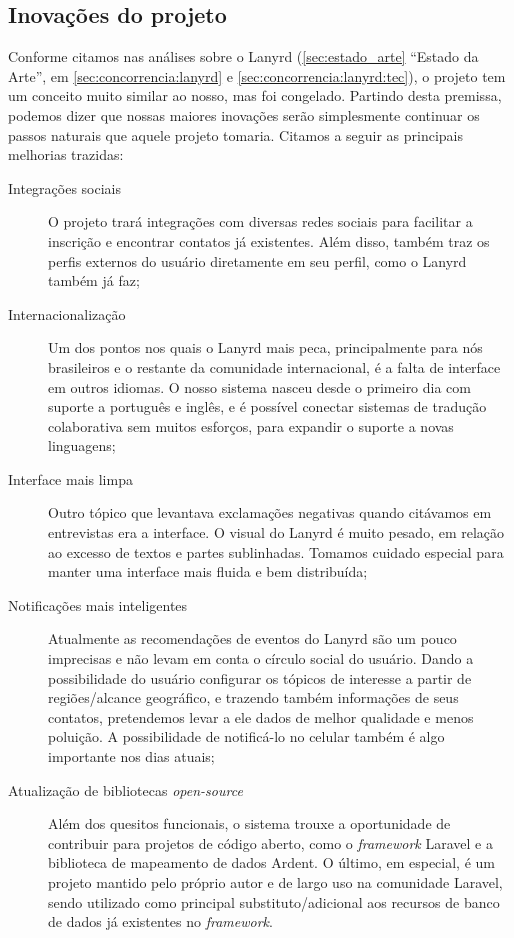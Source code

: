 \documentclass[12pt,a4paper,twoside,hyphens,english,brazil]{abntex2}
\begin{document}
{\subsection{Inovações do projeto}
Conforme citamos nas análises sobre o Lanyrd (\ref{sec:estado_arte} ``Estado da Arte'', em \ref{sec:concorrencia:lanyrd} e \ref{sec:concorrencia:lanyrd:tec}), o projeto tem um conceito muito similar ao nosso, mas foi congelado. Partindo desta premissa, podemos dizer que nossas maiores inovações serão simplesmente continuar os passos naturais que aquele projeto tomaria. Citamos a seguir as principais melhorias trazidas:

\begin{description}
	\item[Integrações sociais] O projeto trará integrações com diversas redes sociais para facilitar a inscrição e encontrar contatos já existentes. Além disso, também traz os perfis externos do usuário diretamente em seu perfil, como o Lanyrd também já faz;
	
	\item[Internacionalização] Um dos pontos nos quais o Lanyrd mais peca, principalmente para nós brasileiros e o restante da comunidade internacional, é a falta de interface em outros idiomas. O nosso sistema nasceu desde o primeiro dia com suporte a português e inglês, e é possível conectar sistemas de tradução colaborativa sem muitos esforços, para expandir o suporte a novas linguagens;
	
	\item[Interface mais limpa] Outro tópico que levantava exclamações negativas quando citávamos em entrevistas era a interface. O visual do Lanyrd é muito pesado, em relação ao excesso de textos e partes sublinhadas. Tomamos cuidado especial para manter uma interface mais fluida e bem distribuída;
	
	\item[Notificações mais inteligentes] Atualmente as recomendações de eventos do Lanyrd são um pouco imprecisas e não levam em conta o círculo social do usuário. Dando a possibilidade do usuário configurar os tópicos de interesse a partir de regiões/alcance geográfico, e trazendo também informações de seus contatos, pretendemos levar a ele dados de melhor qualidade e menos poluição. A possibilidade de notificá-lo no celular também é algo importante nos dias atuais;
	
	\item[Atualização de bibliotecas \emph{open-source}] Além dos quesitos funcionais, o sistema trouxe a oportunidade de contribuir para projetos de código aberto, como o \emph{framework} Laravel e a biblioteca de mapeamento de dados Ardent. O último, em especial, é um projeto mantido pelo próprio autor e de largo uso na comunidade Laravel, sendo utilizado como principal substituto/adicional aos recursos de banco de dados já existentes no \emph{framework}.
\end{description}

}
\end{document}

